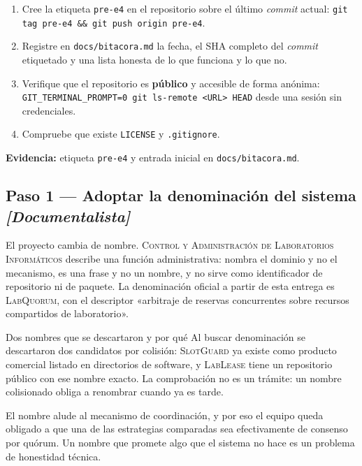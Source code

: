 \documentclass[11pt,a4paper]{article}
\newcommand{\paso}[1]{\subsection{#1}}
\begin{document}
	\begin{enumerate}[leftmargin=*,itemsep=3pt]
		\item Cree la etiqueta \texttt{pre-e4} en el repositorio sobre el último \emph{commit} actual: \texttt{git tag pre-e4 \&\& git push origin pre-e4}.
		\item Registre en \texttt{docs/bitacora.md} la fecha, el SHA completo del \emph{commit} etiquetado y una lista honesta de lo que funciona y lo que no.
		\item Verifique que el repositorio es \textbf{público} y accesible de forma anónima: \texttt{GIT\_TERMINAL\_PROMPT=0 git ls-remote <URL> HEAD} desde una sesión sin credenciales.
		\item Compruebe que existe \texttt{LICENSE} y \texttt{.gitignore}.
	\end{enumerate}
	
	\textbf{Evidencia:} etiqueta \texttt{pre-e4} y entrada inicial en \texttt{docs/bitacora.md}.
	
	\paso{Paso 1 --- Adoptar la denominación del sistema \emph{[Documentalista]}}
	
	El proyecto cambia de nombre. \textsc{Control y Administración de Laboratorios Informáticos} describe una función administrativa: nombra el dominio y no el mecanismo, es una frase y no un nombre, y no sirve como identificador de repositorio ni de paquete. La denominación oficial a partir de esta entrega es \textsc{LabQuorum}, con el descriptor «arbitraje de reservas concurrentes sobre recursos compartidos de laboratorio».
	
	\begin{avisoBox}{Dos nombres que se descartaron y por qué}
		Al buscar denominación se descartaron dos candidatos por colisión: \textsc{SlotGuard} ya existe como producto comercial listado en directorios de software, y \textsc{LabLease} tiene un repositorio público con ese nombre exacto. La comprobación no es un trámite: un nombre colisionado obliga a renombrar cuando ya es tarde.
	\end{avisoBox}
	
	El nombre alude al mecanismo de coordinación, y por eso el equipo queda obligado a que una de las estrategias comparadas sea efectivamente de consenso por quórum. Un nombre que promete algo que el sistema no hace es un problema de honestidad técnica.
	
\end{document}

